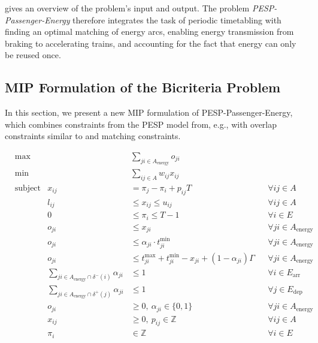 \documentclass[11pt,a4paper]{article}
\newcommand{\pesppassenergy}{PESP-Passenger-Energy\xspace}
\newcommand{\Z}{\mathbb Z}
\theoremstyle{definition}
\theoremstyle{remark}
\begin{document}
 gives an overview of the problem's input and output.
The problem \emph{\pesppassenergy} therefore integrates the task of periodic timetabling with finding an optimal matching of energy arcs, enabling energy transmission from braking to accelerating trains, and accounting for the fact that energy can only be reused once. 



\subsection{MIP Formulation of the Bicriteria Problem}
\label{ss:bicriteria-mip}

In this section, we present a new MIP formulation of \pesppassenergy, which combines constraints from the PESP model from, e.g., \cite{Liebchen2006} with overlap constraints similar to \cite[Constraints~\mbox{[9]}]{Ramos2008} and matching constraints. 


\setcounter{equation}{0}
\begin{align}
	& \max &  & \sum_{ji \in A_{\text{energy}}} o_{ji} & \label{mip:obj1} \\[5 pt] %
	&\min
	& &\sum_{ij \in A}w_{ij} x_{ij} \label{mip:obj2} \\[5pt]
	& \text{subject to}
	& x_{ij} &= \pi_{j}-\pi_{i}+p_{ij}T && \forall ij \in A \label{mip:pesp1} \\
	&& l_{ij}&\leq x_{ij}\leq u_{ij} && \forall  ij \in A\label{mip:pesp2} \\
	&& 0 &\leq \pi_{i} \leq T-1 & & \forall  i \in E \label{mip:pesp3}\\[5pt] %
	& & o_{ji} & \leq x_{ji} & &\forall {ji} \in A_{\text{energy}} \label{mip:energy2}\\
	& &o_{ji}  &\leq \alpha_{ji} \cdot t^{\min}_{ji} & &\forall {ji} \in A_{\text{energy}} \label{mip:energy1}\\
	& & o_{ji} &\leq t^{\max}_{ji} + t^{\min}_{ji} - x_{ji} + (1- \alpha_{ji}) \Gamma & &\forall {ji} \in A_{\text{energy}} \label{mip:energy3}\\[5 pt]
	& & \sum_{ji \in A_{\text{energy}} \cap \delta^-(i)} \alpha_{ji} &\leq 1 & & \forall i \in E_{\text{arr}}  \label{mip:energy5}\\
	& & \sum_{ji \in A_{\text{energy}} \cap \delta^+(j)} \alpha_{ji} &\leq 1 & & \forall j \in E_{\text{dep}} \label{mip:energy6}\\ 
	&& o_{ji} &\ge 0,\ \alpha_{ji} \in \{0,1\}& &  \forall ji \in A_{\text{energy}} \label{mip:energy7} \\
	&& x_{ij} &\ge 0,\ p_{ij} \in \Z & & \forall ij \in A \label{mip:pesp4} \\ 
	&& \pi_i &\in \Z && \forall i \in E \label{mip:pesp5}
\end{align}
\end{document}
